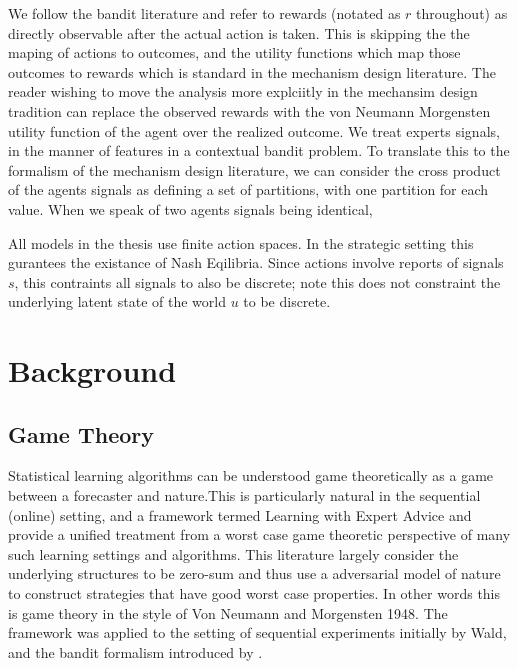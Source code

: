 We follow the bandit literature and refer to rewards (notated as $r$ throughout) as directly observable after the actual action is taken. This is skipping the the maping of actions to outcomes, and the utility functions which map those outcomes to rewards which is standard in the mechanism design literature. The reader wishing to move the analysis more explciitly in the mechansim design tradition can replace the observed rewards with the von Neumann Morgensten utility function of the agent over the realized outcome.
We treat experts signals, in the manner of features in a contextual bandit problem. To translate this to the formalism of the mechanism design literature, we can consider the cross product of the agents signals as defining a set of partitions, with one partition for each value. 
When we speak of two agents signals being identical, 


All models in the thesis use finite action spaces. 
In the strategic setting this gurantees the existance of Nash Eqilibria. 
Since actions involve reports of signals $s$, this contraints all signals to also be discrete; note this does not constraint the underlying latent state of the world $u$ to be discrete.


\section{Background}
\subsection{Game Theory}

Statistical learning algorithms can be understood game theoretically as a game between a forecaster and nature.This is particularly natural in the sequential (online) setting, and a framework termed Learning with Expert Advice and \cite{cesa2006prediction} provide a unified treatment from a worst case game theoretic perspective of many such learning settings and algorithms.
This literature largely consider the underlying structures to be zero-sum and thus use a adversarial model of nature to construct strategies that have good worst case properties. In other words this is game theory in the style of Von Neumann and Morgensten 1948. The framework was applied to the setting of sequential experiments initially by Wald, and the bandit formalism introduced by \cite{robbins1952some}.

